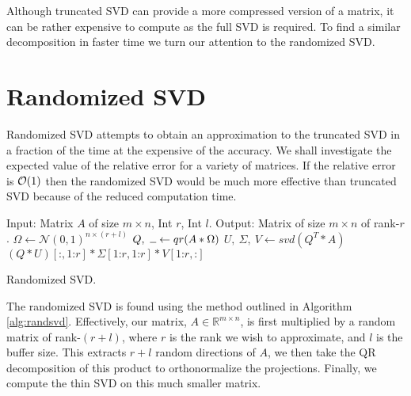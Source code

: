 \documentclass[11pt, a4paper, twocolumn]{article}
\let\originalleft\left
\let\originalright\right
\renewcommand{\left}{\mathopen{}\mathclose\bgroup\originalleft}
\renewcommand{\right}{\aftergroup\egroup\originalright}
\providecommand{\bigO}[1]{\ensuremath{\mathop{}\mathopen{}\mathcal{O}\mathopen{}\left(#1\right)}}
\begin{document}
Although truncated SVD can provide a more compressed version of a matrix, it can be rather expensive to compute as the full SVD is required. To find a similar decomposition in faster time we turn our attention to the randomized SVD.

\section{Randomized SVD}
\label{sec:randsvd}
Randomized SVD attempts to obtain an approximation to the truncated SVD in a fraction of the time at the expensive of the accuracy. We shall investigate the expected value of the relative error for a variety of matrices. If the relative error is $\bigO{1}$ then the randomized SVD would be much more effective than truncated SVD because of the reduced computation time.

\begin{algorithm}[tbp]
    \begin{algorithmic}[1]
        \State Input: Matrix $A$ of size $m \times n$, Int $r$, Int $l$.
        \State Output: Matrix of size $m \times n$ of rank-$r$.
        \State \hspace{\algorithmicindent} $\Omega \gets \mathcal{N}(0, 1)^{n \times (r + l)}$ \label{alg:omega}
        \State \hspace{\algorithmicindent} $Q, \ \rule{2mm}{0.15mm} \gets qr(A * \Omega)$ \label{alg:qr}
        \State \hspace{\algorithmicindent} $U, \ \Sigma, \ V \gets svd(Q^T * A)$ \label{alg:svd} \\
        \Return $(Q * U)[\text{:}, 1\text{:}r] * \Sigma[1 \text{:} r, 1 \text{:} r] * V[1 \text{:} r,\text{:}]$
    \end{algorithmic}
    \caption{Randomized SVD.}
    \label{alg:randsvd}
\end{algorithm}

The randomized SVD is found using the method outlined in Algorithm \ref{alg:randsvd}. Effectively, our matrix, $A \in \mathbb{R}^{m \times n}$, is first multiplied by a random matrix of rank-$(r + l)$, where $r$ is the rank we wish to approximate, and $l$ is the buffer size. This extracts $r + l$ random directions of $A$, we then take the QR decomposition of this product to orthonormalize the projections. Finally, we compute the thin SVD on this much smaller matrix.
\end{document}
